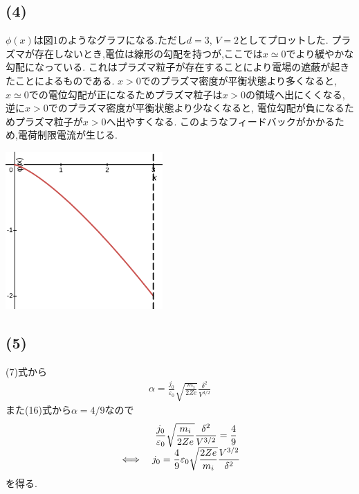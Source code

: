 \documentclass[uplatex,a4j,11pt,dvipdfmx]{jsarticle}
\makeatletter
\def\fgcaption{\def\@captype{figure}\caption}
\makeatother
\begin{document}
\subsection*{(4)}
$\phi(x)$は図1のようなグラフになる.ただし$d=3$, $V=2$としてプロットした.
プラズマが存在しないとき,電位は線形の勾配を持つが,ここでは$x\simeq0$でより緩やかな勾配になっている.
これはプラズマ粒子が存在することにより電場の遮蔽が起きたことによるものである.
$x>0$でのプラズマ密度が平衡状態より多くなると, $x\simeq0$での電位勾配が正になるためプラズマ粒子は$x>0$の領域へ出にくくなる,
逆に$x>0$でのプラズマ密度が平衡状態より少なくなると, 電位勾配が負になるためプラズマ粒子が$x>0$へ出やすくなる.
このようなフィードバックがかかるため,電荷制限電流が生じる.
\begin{center}
  \includegraphics[width=6cm]{x-phi.png}
  \fgcaption{$\phi(x)$のグラフ}
\end{center}
\subsection*{(5)}
(7)式から
\begin{align}
  \alpha=\frac{j_0}{\varepsilon_0}\sqrt{\frac{m_i}{2Ze}}\frac{\delta^2}{V^{3/2}}
\end{align}
また(16)式から$\alpha=4/9$なので
\begin{align}
  \everymath{\displaystyle}
  \begin{array}{cc}
    &\frac{j_0}{\varepsilon_0}\sqrt{\frac{m_i}{2Ze}}\frac{\delta^2}{V^{3/2}}=\frac{4}{9}\\
    \iff&j_0=\frac{4}{9}\varepsilon_0\sqrt{\frac{2Ze}{m_i}}\frac{V^{3/2}}{\delta^2}
  \end{array}
\end{align}
を得る.
\end{document}
